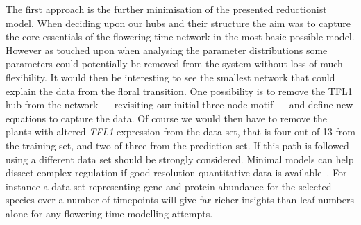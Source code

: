 The first approach is the further minimisation of the presented reductionist model.
When deciding upon our hubs and their structure the aim was to capture the core essentials of the flowering time network in the most basic possible model.
However as touched upon when analysing the parameter distributions some parameters could potentially be removed from the system without loss of much flexibility.
It would then be interesting to see the smallest network that could explain the data from the floral transition.
One possibility is to remove the TFL1 hub from the network --- revisiting our initial three-node motif --- and define new equations to capture the data.
Of course we would then have to remove the plants with altered \emph{TFL1} expression from the data set, that is four out of 13 from the training set, and two of three from the prediction set.
If this path is followed using a different data set should be strongly considered.
Minimal models can help dissect complex regulation if good resolution quantitative data is available~\cite{murray2013}.
For instance a data set representing gene and protein abundance for the selected species over a number of timepoints will give far richer insights than leaf numbers alone for any flowering time modelling attempts.

